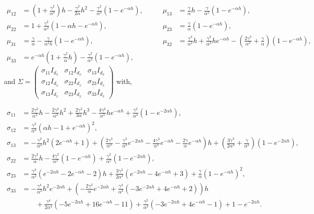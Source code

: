 \begin{equation*}
    \begin{alignedat}{2}
        \mu_{12}&=\left(1+\tfrac{\gamma^2}{\alpha^2}\right)h-\tfrac{\gamma^2}{2\alpha}h^2-\tfrac{\gamma^2}{\alpha^3}\left(1-e^{-\alpha h}\right),\qquad&
    \mu_{13}&=\tfrac{\gamma}{\alpha}h-\tfrac{\gamma}{\alpha^2}\left(1-e^{-\alpha h}\right),\\
    \mu_{22}&=1+\tfrac{\gamma^2}{\alpha^2}\left(1-\alpha h - e^{-\alpha h}\right),&
    \mu_{23}&=\tfrac{\gamma}{\alpha}\left(1-e^{-\alpha h}\right),\\
    \mu_{31}&=\tfrac{\gamma}{\alpha}-\tfrac{\gamma}{\alpha^2h}\left(1-e^{-\alpha h}\right),&
    \mu_{32}&=\tfrac{\gamma^3}{\alpha^2}h+\tfrac{\gamma^3}{\alpha^2}he^{-\alpha h}-\left(\tfrac{2\gamma^3}{\alpha^3}+\tfrac{\gamma}{\alpha}\right)\left(1-e^{-\alpha h}\right),\\
    \mu_{33}&=e^{-\alpha h}\left(1+\tfrac{\gamma^2}{\alpha}h\right)-\tfrac{\gamma^2}{\alpha^2}\left(1-e^{-\alpha h}\right),
    \end{alignedat}
\end{equation*}
and $\Sigma=\begin{pmatrix}
    \sigma_{11}I_{d_x} & \sigma_{12}I_{d_x} & \sigma_{13}I_{d_x} \\
    \sigma_{12}I_{d_x} & \sigma_{22}I_{d_x} & \sigma_{23}I_{d_x} \\
    \sigma_{13}I_{d_x} & \sigma_{23}I_{d_x} & \sigma_{33}I_{d_x}
\end{pmatrix}$ with,

\begin{align*}
    \sigma_{11}&=\tfrac{2\gamma^2}{\alpha^3}h-\tfrac{2\gamma^2}{\alpha^2}h^2+\tfrac{2\gamma^2}{3\alpha}h^3-\tfrac{4\gamma^2}{\alpha^3}he^{-\alpha h}+\tfrac{\gamma^2}{\alpha^4}\left(1-e^{-2\alpha h}\right),\\
    \sigma_{12}&=\tfrac{\gamma^2}{\alpha^3}\left(\alpha h - 1 + e^{-\alpha h}\right)^2,\\
    \sigma_{13}&=-\tfrac{\gamma^3}{\alpha^2}h^2\left(2e^{-\alpha h}+1\right)+\left(\tfrac{2\gamma^3}{\alpha^3}-\tfrac{\gamma^3}{\alpha^3}e^{-2\alpha h}-\tfrac{4\gamma^3}{\alpha^3}e^{-\alpha h}-\tfrac{2\gamma}{\alpha}e^{-\alpha h}\right)h+\left(\tfrac{3\gamma^3}{2\alpha^4}+\tfrac{\gamma}{\alpha^2}\right)\left(1-e^{-2\alpha h}\right),\\
    \sigma_{22}&=\tfrac{2\gamma^2}{\alpha}h-\tfrac{4\gamma^2}{\alpha^2}\left(1-e^{-\alpha h}\right)+\tfrac{\gamma^2}{\alpha^2}\left(1-e^{-2\alpha h}\right),\\
    \sigma_{23}&=\tfrac{\gamma^3}{\alpha^2}\left(e^{-2\alpha h}-2e^{-\alpha h}-2\right)h+\tfrac{3\gamma^3}{2\alpha^3}\left(e^{-2\alpha h}-4e^{-\alpha h}+3\right)+\tfrac{\gamma}{\alpha}\left(1-e^{-\alpha h}\right)^2,\\
    \sigma_{33}&=-\tfrac{\gamma^4}{\alpha^2}h^2e^{-2\alpha h}+\left(-\tfrac{2\gamma^2}{\alpha}e^{-2\alpha h}+\tfrac{\gamma^4}{\alpha^3}\left(-3e^{-2\alpha h}+4e^{-\alpha h}+2\right)\right)h\\
    &\qquad +\tfrac{\gamma^4}{2\alpha^4}\left(-5e^{-2\alpha h}+16 e^{-\alpha h}-11\right)+\tfrac{\gamma^2}{\alpha^2}\left(-3e^{-2\alpha h}+4e^{-\alpha h}-1\right)+1-e^{-2\alpha h}.
\end{align*}


